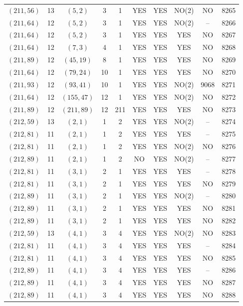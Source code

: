 \begin{longtable}{|c|c|c|c|c|c|c|c|c|c|}
$(211, 56)$ & 13 & $(5, 2)$ & 3 & 1 & YES & YES & NO(2) & NO & 8265\\
$(211, 64)$ & 12 & $(5, 2)$ & 3 & 1 & YES & YES & NO(2) & -- & 8266\\
$(211, 64)$ & 12 & $(5, 2)$ & 3 & 1 & YES & YES & YES & NO & 8267\\
$(211, 64)$ & 12 & $(7, 3)$ & 4 & 1 & YES & YES & YES & NO & 8268\\
$(211, 89)$ & 12 & $(45, 19)$ & 8 & 1 & YES & YES & YES & NO & 8269\\
$(211, 64)$ & 12 & $(79, 24)$ & 10 & 1 & YES & YES & YES & NO & 8270\\
$(211, 93)$ & 12 & $(93, 41)$ & 10 & 1 & YES & YES & NO(2) & 9068 & 8271\\
$(211, 64)$ & 12 & $(155, 47)$ & 12 & 1 & YES & YES & NO(2) & NO & 8272\\
$(211, 89)$ & 12 & $(211, 89)$ & 12 & 211 & YES & YES & YES & NO & 8273\\
$(212, 59)$ & 13 & $(2, 1)$ & 1 & 2 & YES & YES & NO(2) & -- & 8274\\
$(212, 81)$ & 11 & $(2, 1)$ & 1 & 2 & YES & YES & YES & -- & 8275\\
$(212, 81)$ & 11 & $(2, 1)$ & 1 & 2 & YES & YES & NO(2) & NO & 8276\\
$(212, 89)$ & 11 & $(2, 1)$ & 1 & 2 & NO & YES & NO(2) & -- & 8277\\
$(212, 81)$ & 11 & $(3, 1)$ & 2 & 1 & YES & YES & YES & -- & 8278\\
$(212, 81)$ & 11 & $(3, 1)$ & 2 & 1 & YES & YES & YES & NO & 8279\\
$(212, 89)$ & 11 & $(3, 1)$ & 2 & 1 & YES & YES & NO(2) & -- & 8280\\
$(212, 89)$ & 11 & $(3, 1)$ & 2 & 1 & YES & YES & YES & NO & 8281\\
$(212, 89)$ & 11 & $(3, 1)$ & 2 & 1 & YES & YES & YES & NO & 8282\\
$(212, 59)$ & 13 & $(4, 1)$ & 3 & 4 & YES & YES & NO(2) & NO & 8283\\
$(212, 81)$ & 11 & $(4, 1)$ & 3 & 4 & YES & YES & YES & -- & 8284\\
$(212, 81)$ & 11 & $(4, 1)$ & 3 & 4 & YES & YES & YES & NO & 8285\\
$(212, 89)$ & 11 & $(4, 1)$ & 3 & 4 & YES & YES & YES & -- & 8286\\
$(212, 89)$ & 11 & $(4, 1)$ & 3 & 4 & YES & YES & YES & NO & 8287\\
$(212, 89)$ & 11 & $(4, 1)$ & 3 & 4 & YES & YES & YES & NO & 8288\\

\end{longtable}
